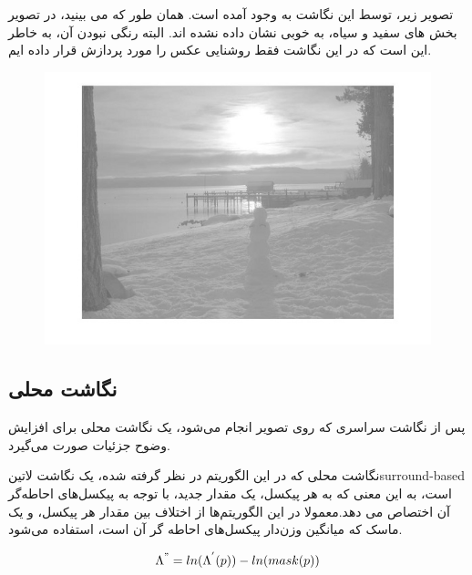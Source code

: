 تصویر زیر، توسط این نگاشت به وجود آمده است. همان طور که می بینید، در تصویر بخش های سفید و سیاه، به خوبی نشان داده نشده اند. البته رنگی نبودن آن، به خاطر این است که در این نگاشت فقط روشنایی عکس را مورد پردازش قرار داده ایم.

 
 \begin{figure}[!htb]

 		\includegraphics[width=\linewidth]{images/retinexglobal}

 		\caption{}\label{fig:logtonemap}

 		\endminipage\hfill

 \end{figure}
 
 
\subsection{نگاشت محلی}

پس از نگاشت سراسری که روی تصویر انجام می‌شود، یک نگاشت محلی برای افزایش وضوح جزئیات صورت می‌گیرد.

نگاشت محلی که در این الگوریتم در نظر گرفته شده، یک نگاشت 
‌لاتین{surround-based }
  است، به  این معنی که به هر پیکسل، یک مقدار جدید، با توجه به پیکسل‌های احاطه‌گر آن اختصاص می دهد.معمولا در این الگوریتم‌ها از اختلاف بین مقدار هر پیکسل، و یک ماسک که میانگین وزن‌دار پیکسل‌های احاطه گر آن است، استفاده می‌شود.
  


\begin{equation}
	\Lambda^{"} = ln(\Lambda^{'}(p)) - ln(mask(p))
\end{equation}

